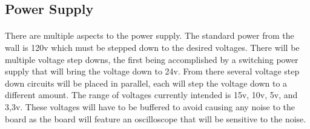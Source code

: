 \subsection{Power Supply}
\paragraph*{}There are multiple aspects to the power supply. The standard power from the wall is 120v which must be stepped down to the desired voltages. There will be multiple voltage step downs, the first being accomplished by a switching power supply that will bring the voltage down to 24v. From there several voltage step down circuits will be placed in parallel, each will step the voltage down to a different amount. The range of voltages currently intended is 15v, 10v, 5v, and 3,3v. These voltages will have to be buffered to avoid causing any noise to the board as the board will feature an oscilloscope that will be sensitive to the noise.